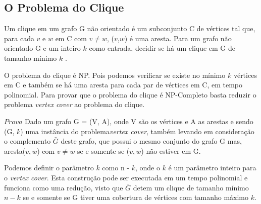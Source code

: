 \subsection{O Problema do Clique}

Um clique em um grafo G não orientado é um subconjunto C de vértices tal que, para cada $v$ e $w$ em C com $v \neq w$, ($v$,$w$) é uma aresta.
Para um grafo não orientado G e um inteiro $k$ como entrada, decidir se há um clique em G de tamanho mínimo $k$ \cite{goodrichprojeto}.

O problema do clique é NP. Pois podemos verificar se existe no mínimo $k$ vértices em C e também se há uma aresta para cada par de vértices em C, em tempo polinomial. Para provar que o problema do clique é NP-Completo basta reduzir o problema \textit{vertex cover} ao problema do clique.

$Prova$ Dado um grafo G = (V, A), onde V são os vértices e A as arestas e sendo (G, $k$) uma instância do problema\textit{vertex cover}, também levando em consideração o complemento $\bar{G}$ deste grafo, que possui o mesmo conjunto do grafo G mas, aresta($v,w$) com $v \neq w$ se e somente se ($v,w$) não estiver em G.

Podemos definir o parâmetro $k$ como n - $k$, onde o $k$ é um parâmetro inteiro para o \textit{vertex cover}. Esta construção pode ser executada em um tempo polinomial e funciona como uma redução, visto que $\bar{G}$ detem um clique de tamanho mínimo $n-k$ se e somente se G tiver uma cobertura de vértices com tamanho máximo $k$.
